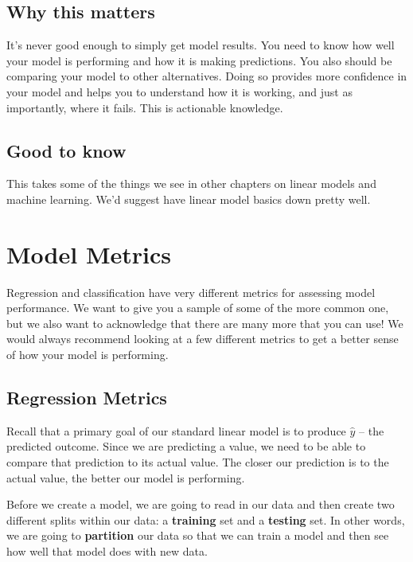 \documentclass[
  letterpaper,
]{krantz}
\begin{document}
\subsection{Why this matters}\label{sec-knowing-why}

It's never good enough to simply get model results. You need to know how
well your model is performing and how it is making predictions. You also
should be comparing your model to other alternatives. Doing so provides
more confidence in your model and helps you to understand how it is
working, and just as importantly, where it fails. This is actionable
knowledge.

\subsection{Good to know}\label{sec-knowing-good}

This takes some of the things we see in other chapters on linear models
and machine learning. We'd suggest have linear model basics down pretty
well.

\section{Model Metrics}\label{sec-knowing-metrics}

Regression and classification have very different metrics for assessing
model performance. We want to give you a sample of some of the more
common one, but we also want to acknowledge that there are many more
that you can use! We would always recommend looking at a few different
metrics to get a better sense of how your model is performing.

\subsection{Regression Metrics}\label{sec-knowing-reg-metrics}

Recall that a primary goal of our standard linear model is to produce
\(\hat{y}\) -- the predicted outcome. Since we are predicting a value,
we need to be able to compare that prediction to its actual value. The
closer our prediction is to the actual value, the better our model is
performing.

Before we create a model, we are going to read in our data and then
create two different splits within our data: a \textbf{training} set and
a \textbf{testing} set. In other words, we are going to
\textbf{partition} our data so that we can train a model and then see
how well that model does with new data.
\end{document}
